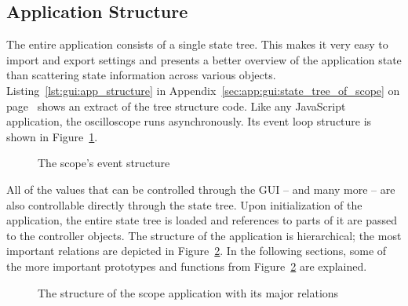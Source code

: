 %
%
\subsection{Application Structure} %
\label{subsec:gui:application_structure}


The  entire   application  consists  of   a  single  state   tree. This  makes
it   very   easy   to   import    and   export   settings   and   presents   a
better   overview   of   the   application   state   than   scattering   state
information   across  various   objects.   Listing~\ref{lst:gui:app_structure}
in              Appendix~\ref{sec:app:gui:state_tree_of_scope}              on
page~\pageref{sec:app:gui:state_tree_of_scope}   shows  an   extract  of   the
tree  structure  code. Like  any   JavaScript  application,  the  oscilloscope
runs    asynchronously. Its    event    loop    structure    is    shown    in
Figure~\ref{fig:gui:eventstructure}.

\begin{figure}
    \centering
    
    \caption[Scope Event Structure]{%
        The scope's event structure
    }
    \label{fig:gui:eventstructure}
\end{figure}

All of the values  that can be controlled through the GUI --  and many more --
are  also controllable  directly through  the state  tree. Upon initialization
of  the  application, the  entire  state  tree  is  loaded and  references  to
parts  of it  are passed  to  the controller  objects.  The  structure of  the
application  is hierarchical;  the most  important relations  are depicted  in
Figure~\ref{fig:gui:structure}.  In  the following sections, some  of the more
important  prototypes and  functions  from Figure~\ref{fig:gui:structure}  are
explained.

\begin{figure}
    \centering
    
    \caption[The Scope Structure]{%
        The structure of the scope application with its major relations%
    }
    \label{fig:gui:structure}
\end{figure}

